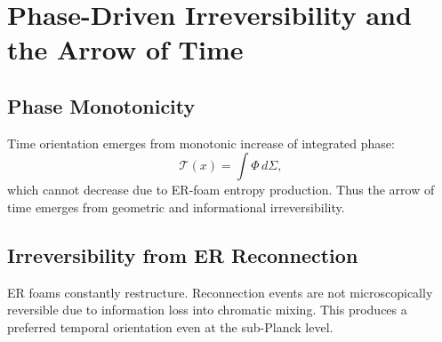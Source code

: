 \chapter{Phase-Driven Irreversibility and the Arrow of Time}

\section{Phase Monotonicity}

Time orientation emerges from monotonic increase of integrated phase:
\[
\mathcal{T}(x) = \int \Phi\, d\Sigma,
\]
which cannot decrease due to ER-foam entropy production.
Thus the arrow of time emerges from geometric and informational irreversibility.

\section{Irreversibility from ER Reconnection}

ER foams constantly restructure.
Reconnection events are not microscopically reversible due to information loss into chromatic mixing.
This produces a preferred temporal orientation even at the sub-Planck level.


